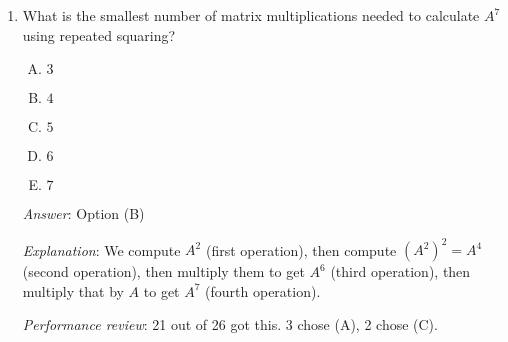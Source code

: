 \documentclass[10pt]{amsart}
\begin{document}
\begin{enumerate}
  \begin{enumerate}[(A)]
  \item $\Theta(1)$
  \item $\Theta(\log_2 n)$
  \item $\Theta(n \log_2 n)$
  \item $\Theta(n^2)$
  \item $\Theta(n^2 \log_2 n)$
  \end{enumerate}

  {\em Answer}: Option (B)

  {\em Explanation}: We need to calculate $n^2$ matrix entries in the
  product, but all the entries can be computed in parallel, and the
  time taken to compute a matrix entry is the time taken to perform a
  single dot product. As we saw earlier, this is $\Theta(\log_2 n)$.

  We are given a $n \times n$ matrix $A$ and we want to use {\em
    repeated squaring} to calculate powers of $A$. For instance, to
  calculate $A^4$, we can simply calculate $(A^2)^2$, which requires
  two multiplications. To calculate $A^5$, we calculate $(A^2)^2A$,
  which requires three multiplications. Assume that we can store any
  number of intermediate matrices, i.e., storage space is not a
  constraint.

  {\em Performance review}: 5 out of 26 got this. 19 chose (E), 2
  chose (C).

  {\em Historical note (last time)}: $13$ out of $26$ got this. $9$
  chose (E), $2$ chose (D), $1$ each chose (A) and (C).
\item What is the smallest number of matrix multiplications needed to
  calculate $A^7$ using repeated squaring?

  \begin{enumerate}[(A)]
  \item $3$
  \item $4$
  \item $5$
  \item $6$
  \item $7$
  \end{enumerate}

  {\em Answer}: Option (B)

  {\em Explanation}: We compute $A^2$ (first operation), then compute
  $(A^2)^2 = A^4$ (second operation), then multiply them to get $A^6$
  (third operation), then multiply that by $A$ to get $A^7$ (fourth
  operation).

  {\em Performance review}: 21 out of 26 got this. 3 chose (A), 2 chose (C).


\end{enumerate}
\end{document}
